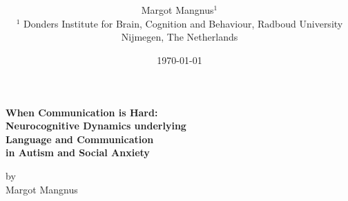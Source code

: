 \documentclass[twoside,openright,12pt,fleqn]{book}
\title{\vspace{-15mm}\fontsize{24pt}{10pt}\selectfont\textbf{}} %
\author{
\large
{Margot Mangnus$^1$}\\[2mm] %
\small $^1$ Donders Institute for Brain, Cognition and Behaviour, Radboud University Nijmegen, The Netherlands\\ %
\vspace{-5mm}
}
\date{\today}
\newcommand\blankpage{
    \null
    \thispagestyle{empty}
    \addtocounter{page}{-1}
    \newpage}
\begin{document}
\setlength{\parindent}{0.5pt}
\renewcommand{\vec}[1]{\mathbf{#1}} %

\begin{titlepage}
	\centering
	\vspace{1cm}
	\vspace{1.5cm}
	{\huge\bfseries When Communication is Hard: \\ Neurocognitive Dynamics underlying \\ Language and Communication \\in Autism and Social Anxiety \par}	%
	\vspace{4cm}
	{\Large by \\ Margot Mangnus \par}
	\vfill
\end{titlepage}

%

\tableofcontents

\newpage







\end{document}
